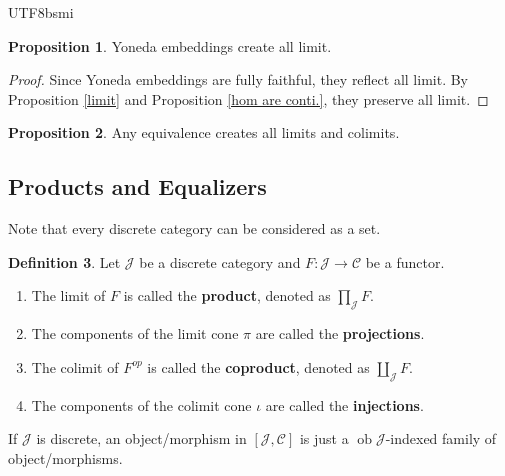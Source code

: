 \documentclass[12pt]{article}
\theoremstyle{definition}
\newtheorem{definition}{Definition}[section]
\newtheorem{property}[definition]{Proposition}
\newcommand\<{\langle}
\renewcommand\>{\rangle}
\DeclareMathOperator{\ob}{ob}
\begin{document}
\begin{CJK}{UTF8}{bsmi}
\begin{property}
    Yoneda embeddings create all limit.
\end{property}
\begin{proof}
    Since Yoneda embeddings are fully faithful, they reflect all limit.
    By Proposition \ref{limit} and Proposition \ref{hom are conti.}, they preserve all limit.
\end{proof}

\begin{property}
    Any equivalence creates all limits and colimits.
\end{property}

\subsection{Products and Equalizers}

Note that every discrete category can be considered as a set.

\begin{definition}
    Let $\mathcal{J}$ be a discrete category and $F:\mathcal{J}\to\mathcal{C}$ be a functor.
    \begin{enumerate}
        \item The limit of $F$ is called the \textbf{product}, denoted as $\prod_\mathcal{J}F$.
        \item[] The components of the limit cone $\pi$ are called the \textbf{projections}.
        \item The colimit of $F^{op}$ is called the \textbf{coproduct}, denoted as $\coprod_\mathcal{J}F$.
        \item[] The components of the colimit cone $\iota$ are called the \textbf{injections}.
    \end{enumerate}
\end{definition}

If $\mathcal{J}$ is discrete, an object/morphism in $[\mathcal{J}, \mathcal{C}]$ is just a $\ob\mathcal{J}$-indexed family of object/morphisms.


\end{CJK}
\end{document}
